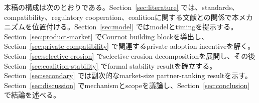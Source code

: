 本稿の構成は次のとおりである。Section~\ref{sec:literature} では、standards、compatibility、regulatory cooperation、coalitionに関する文献との関係で本メカニズムを位置付ける。Section~\ref{sec:model} ではmodelとtimingを提示する。Section~\ref{sec:product-market} でCournot building blockを導出し、Section~\ref{sec:private-compatibility} で関連するprivate-adoption incentiveを解く。Section~\ref{sec:selective-erosion} でselective-erosion decompositionを展開し、その後Section~\ref{sec:coalition-stability} でformal stability resultを確立する。Section~\ref{sec:secondary} では副次的なmarket-size partner-ranking resultを示す。Section~\ref{sec:discussion} でmechanismとscopeを議論し、Section~\ref{sec:conclusion} で結論を述べる。
